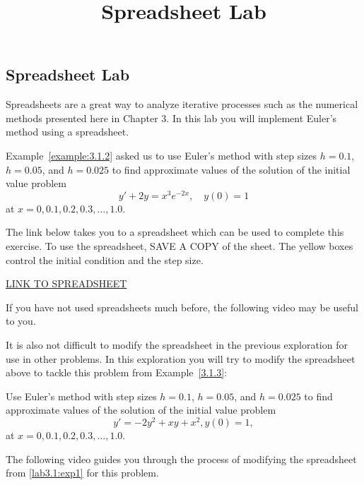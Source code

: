 \documentclass{ximera}
\title{Spreadsheet Lab} \license{CC BY-NC-SA 4.0}
\begin{document}
\begin{abstract}
\end{abstract}
\maketitle

\begin{onlineOnly}
\section*{Spreadsheet Lab}
\end{onlineOnly}
 
Spreadsheets are a great way to analyze iterative processes such as the numerical methods presented here in Chapter 3.  In this lab you will implement Euler's method using a spreadsheet.
 
 
\begin{exploration}\label{lab3.1:exp1}
Example~\ref{example:3.1.2} asked us to use Euler's method with step sizes $h=0.1$, $h=0.05$, and $h=0.025$ to
find approximate values of the solution of the initial value problem
$$
y'+2y=x^3e^{-2x},\quad y(0)=1
$$
at $x=0, 0.1, 0.2, 0.3, \ldots, 1.0$.
 
The link below takes you to a spreadsheet which can be used to complete this exercise.  To use the spreadsheet, SAVE A COPY of the sheet.  The yellow boxes control the initial condition and the step size. 
     
\href{https://docs.google.com/spreadsheets/d/1lwpCOPT5r04jL-joCXHSBRkXJdSxftxX46OzJe2II2U/edit?usp=sharing}{LINK TO SPREADSHEET}

If you have not used spreadsheets much before, the following video may be useful to you.


\end{exploration}
 
\begin{exploration}\label{lab3.1:exp2}
 It is also not difficult to modify the spreadsheet in the previous exploration for use in other problems.  In this exploration you will try to modify the spreadsheet above to tackle this problem from Example~\ref{3.1.3}:

Use Euler's method with step sizes $h=0.1$, $h=0.05$, and $h=0.025$ to
find approximate values of the solution of the initial value problem
$$
y'=-2y^2+xy+x^2, y(0)=1,
$$
at $x=0, 0.1, 0.2, 0.3, \ldots, 1.0$.

The following video guides you through the process of modifying the spreadsheet from \ref{lab3.1:exp1} for this problem.

    
\end{exploration}



 
 




 
\end{document}
